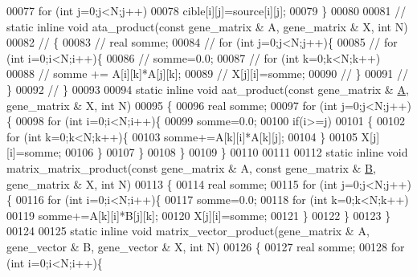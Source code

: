 \begin{DoxyCode}
00077       \textcolor{keywordflow}{for} (\textcolor{keywordtype}{int} j=0;j<N;j++)
00078         cible[i][j]=source[i][j];
00079   \}
00080 
00081 \textcolor{comment}{//   static inline void ata\_product(const gene\_matrix & A, gene\_matrix & X, int N)}
00082 \textcolor{comment}{//   \{}
00083 \textcolor{comment}{//     real somme;}
00084 \textcolor{comment}{//     for (int j=0;j<N;j++)\{}
00085 \textcolor{comment}{//       for (int i=0;i<N;i++)\{}
00086 \textcolor{comment}{//         somme=0.0;}
00087 \textcolor{comment}{//         for (int k=0;k<N;k++)}
00088 \textcolor{comment}{//           somme += A[i][k]*A[j][k];}
00089 \textcolor{comment}{//         X[j][i]=somme;}
00090 \textcolor{comment}{//       \}}
00091 \textcolor{comment}{//     \}}
00092 \textcolor{comment}{//   \}}
00093 
00094   \textcolor{keyword}{static} \textcolor{keyword}{inline} \textcolor{keywordtype}{void} aat\_product(\textcolor{keyword}{const} gene\_matrix & \hyperlink{group___core___module_class_eigen_1_1_matrix}{A}, gene\_matrix & X, \textcolor{keywordtype}{int} N)
00095   \{
00096     real somme;
00097     \textcolor{keywordflow}{for} (\textcolor{keywordtype}{int} j=0;j<N;j++)\{
00098       \textcolor{keywordflow}{for} (\textcolor{keywordtype}{int} i=0;i<N;i++)\{
00099         somme=0.0;
00100         \textcolor{keywordflow}{if}(i>=j)
00101         \{
00102           \textcolor{keywordflow}{for} (\textcolor{keywordtype}{int} k=0;k<N;k++)\{
00103             somme+=A[k][i]*A[k][j];
00104           \}
00105           X[j][i]=somme;
00106         \}
00107       \}
00108     \}
00109   \}
00110 
00111 
00112   \textcolor{keyword}{static} \textcolor{keyword}{inline} \textcolor{keywordtype}{void} matrix\_matrix\_product(\textcolor{keyword}{const} gene\_matrix & A, \textcolor{keyword}{const} gene\_matrix & 
      \hyperlink{group___core___module_class_eigen_1_1_matrix}{B}, gene\_matrix & X, \textcolor{keywordtype}{int} N)
00113   \{
00114     real somme;
00115     \textcolor{keywordflow}{for} (\textcolor{keywordtype}{int} j=0;j<N;j++)\{
00116       \textcolor{keywordflow}{for} (\textcolor{keywordtype}{int} i=0;i<N;i++)\{
00117         somme=0.0;
00118         \textcolor{keywordflow}{for} (\textcolor{keywordtype}{int} k=0;k<N;k++)
00119           somme+=A[k][i]*B[j][k];
00120         X[j][i]=somme;
00121       \}
00122     \}
00123   \}
00124 
00125   \textcolor{keyword}{static} \textcolor{keyword}{inline} \textcolor{keywordtype}{void} matrix\_vector\_product(gene\_matrix & A, gene\_vector & B, gene\_vector & X, \textcolor{keywordtype}{int} N)
00126   \{
00127     real somme;
00128     \textcolor{keywordflow}{for} (\textcolor{keywordtype}{int} i=0;i<N;i++)\{

\end{DoxyCode}
